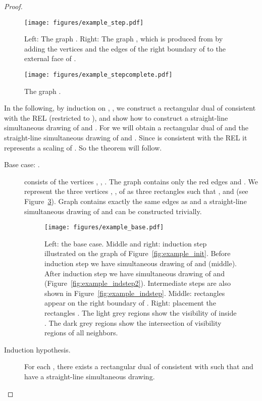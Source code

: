 \documentclass{llncs}
\begin{document}
\begin{proof}
\begin{figure}[htb]
\centering
\texttt{[image: figures/example\_step.pdf]}
\caption{Left: The graph . Right: The graph , which is produced from  by adding the vertices and the edges of the right boundary of  to the external face of .}
\label{fig:example_subgraph}
\end{figure}

\begin{figure}[htb]
\centering
\texttt{[image: figures/example\_stepcomplete.pdf]}
\caption{The graph .}
\label{fig:example_step}
\end{figure}

In the following, by induction on , , we construct a rectangular dual  of  
consistent with the REL  (restricted to ), and show how to construct a straight-line simultaneous drawing of  and . For  we will obtain a rectangular dual  of  and the straight-line simultaneous drawing of  and . Since  is consistent with the REL  it represents a scaling of . So the theorem will follow.

 \begin{description}
\item[Base case: .]     consists of the vertices , , .  The graph  contains only the red edges   and .  We represent the three vertices , ,  of  as three rectangles such that ,   and  (see Figure~\ref{fig:example_base}). Graph  contains exactly the same edges as  and a straight-line simultaneous drawing of  and  can be constructed trivially.

\begin{figure}[htb]
\centering
\texttt{[image: figures/example\_base.pdf]}
\caption{Left: the base case. Middle and right: induction step illustrated on the graph of Figure~\ref{fig:example_init}. Before induction step we have  simultaneous drawing of  and  (middle). After induction step we have simultaneous drawing of  and   (Figure~\ref{fig:example_indstep2}). Intermediate steps are also shown in Figure~\ref{fig:example_indstep}. Middle: rectangles  appear on the right boundary of . Right: placement the rectangles  . The light grey regions show the  visibility of  inside . The dark grey regions show the intersection of visibility regions of all neighbors. }
\label{fig:example_base} 
\end{figure}

\item[Induction hypothesis.] For each , there exists a rectangular dual  of  consistent with  such that  and  have a straight-line simultaneous drawing.


\end{description}
\end{proof}
\end{document}
